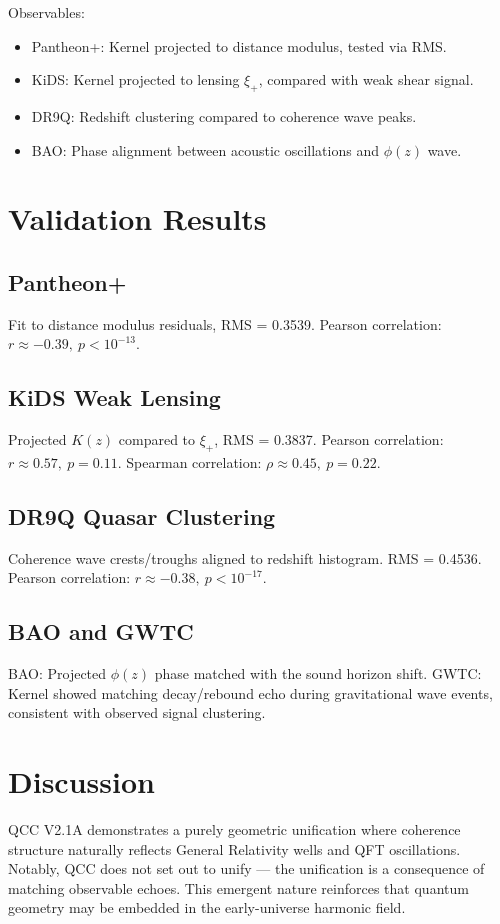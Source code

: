 \documentclass[12pt]{article}
\begin{document}
Observables:
\begin{itemize}
  \item Pantheon+: Kernel projected to distance modulus, tested via RMS.
  \item KiDS: Kernel projected to lensing \( \xi_+ \), compared with weak shear signal.
  \item DR9Q: Redshift clustering compared to coherence wave peaks.
  \item BAO: Phase alignment between acoustic oscillations and \( \phi(z) \) wave.
\end{itemize}

\section{Validation Results}
\subsection{Pantheon+}
Fit to distance modulus residuals, RMS = 0.3539. Pearson correlation: \( r \approx -0.39, \ p < 10^{-13} \).

\subsection{KiDS Weak Lensing}
Projected \( K(z) \) compared to \( \xi_+ \), RMS = 0.3837. Pearson correlation: \( r \approx 0.57, \ p = 0.11 \). Spearman correlation: \( \rho \approx 0.45, \ p = 0.22 \).

\subsection{DR9Q Quasar Clustering}
Coherence wave crests/troughs aligned to redshift histogram. RMS = 0.4536. Pearson correlation: \( r \approx -0.38, \ p < 10^{-17} \).

\subsection{BAO and GWTC}
BAO: Projected \( \phi(z) \) phase matched with the sound horizon shift.\newline
GWTC: Kernel showed matching decay/rebound echo during gravitational wave events, consistent with observed signal clustering.

\section{Discussion}
QCC V2.1A demonstrates a purely geometric unification where coherence structure naturally reflects General Relativity wells and QFT oscillations. Notably, QCC does not set out to unify — the unification is a consequence of matching observable echoes. This emergent nature reinforces that quantum geometry may be embedded in the early-universe harmonic field.
\end{document}
